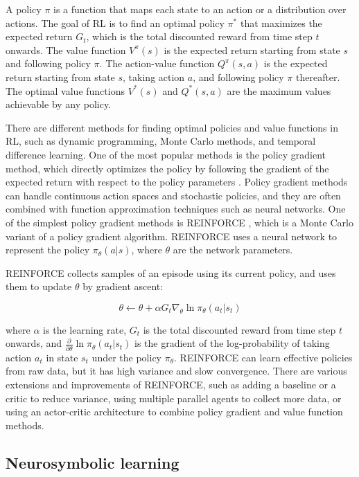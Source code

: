 \documentclass{article}
\begin{document}
A policy $\pi$ is a function that maps each state to an action or a distribution over actions. The goal of RL is to find an optimal policy $\pi^*$ that maximizes the expected return $G_t$, which is the total discounted reward from time step $t$ onwards. The value function $V^\pi(s)$ is the expected return starting from state $s$ and following policy $\pi$. The action-value function $Q^\pi(s,a)$ is the expected return starting from state $s$, taking action $a$, and following policy $\pi$ thereafter. The optimal value functions $V^*(s)$ and $Q^*(s,a)$ are the maximum values achievable by any policy.

There are different methods for finding optimal policies and value functions in RL, such as dynamic programming, Monte Carlo methods, and temporal difference learning. One of the most popular methods is the policy gradient method, which directly optimizes the policy by following the gradient of the expected return with respect to the policy parameters \cite{sutton1999policy}. Policy gradient methods can handle continuous action spaces and stochastic policies, and they are often combined with function approximation techniques such as neural networks.
One of the simplest policy gradient methods is REINFORCE \cite{williams1992simple}, which is a Monte Carlo variant of a policy gradient algorithm. REINFORCE uses a neural network to represent the policy $\pi_\theta(a|s)$, where $\theta$ are the network parameters. 

REINFORCE collects samples of an episode using its current policy, and uses them to update $\theta$ by gradient ascent:

\begin{equation}
\theta \leftarrow \theta + \alpha G_t \nabla_\theta \ln \pi_\theta(a_t|s_t)
\end{equation}

where $\alpha$ is the learning rate, $G_t$ is the total discounted reward from time step $t$ onwards, and $\frac{\partial}{\partial \theta} \ln \pi_{\theta}(a_t|s_t)$ is the gradient of the log-probability of taking action $a_t$ in state $s_t$ under the policy $\pi_{\theta}$. REINFORCE can learn effective policies from raw data, but it has high variance and slow convergence. There are various extensions and improvements of REINFORCE, such as adding a baseline or a critic to reduce variance, using multiple parallel agents to collect more data, or using an actor-critic architecture to combine policy gradient and value function methods.

\subsection{Neurosymbolic learning}
\end{document}
